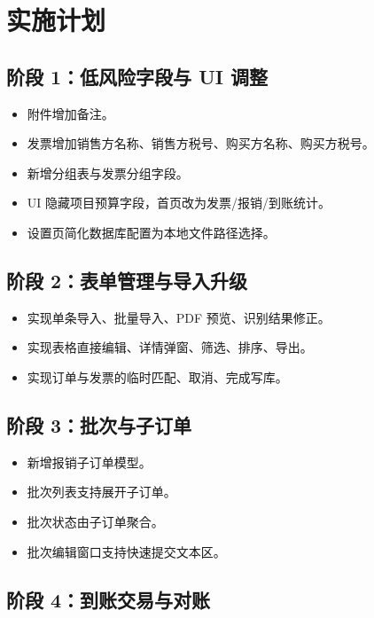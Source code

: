 \documentclass[UTF8,zihao=-4]{ctexart}
\begin{document}
\section{实施计划}

\subsection{阶段 1：低风险字段与 UI 调整}

\begin{itemize}
  \item 附件增加备注。
  \item 发票增加销售方名称、销售方税号、购买方名称、购买方税号。
  \item 新增分组表与发票分组字段。
  \item UI 隐藏项目预算字段，首页改为发票/报销/到账统计。
  \item 设置页简化数据库配置为本地文件路径选择。
\end{itemize}

\subsection{阶段 2：表单管理与导入升级}

\begin{itemize}
  \item 实现单条导入、批量导入、PDF 预览、识别结果修正。
  \item 实现表格直接编辑、详情弹窗、筛选、排序、导出。
  \item 实现订单与发票的临时匹配、取消、完成写库。
\end{itemize}

\subsection{阶段 3：批次与子订单}

\begin{itemize}
  \item 新增报销子订单模型。
  \item 批次列表支持展开子订单。
  \item 批次状态由子订单聚合。
  \item 批次编辑窗口支持快速提交文本区。
\end{itemize}

\subsection{阶段 4：到账交易与对账}
\end{document}
